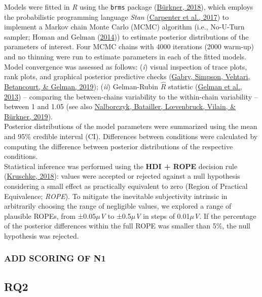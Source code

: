 \documentclass[
  man,floatsintext]{apa6}
\begin{document}
Models were fitted in \emph{R} using the \texttt{brms} package (\protect\hyperlink{ref-buxfcrkner2018}{Bürkner, 2018}), which employs the probabilistic programming language \emph{Stan} (\protect\hyperlink{ref-carpenter2017}{Carpenter et al., 2017}) to implement a Markov chain Monte Carlo (MCMC) algorithm (i.e., No-U-Turn sampler; Homan and Gelman (\protect\hyperlink{ref-homan2014}{2014})) to estimate posterior distributions of the parameters of interest. Four MCMC chains with 4000 iterations (2000 warm-up) and no thinning were run to estimate parameters in each of the fitted models. Model convergence was assessed as follows: (\emph{i}) visual inspection of trace plots, rank plots, and graphical posterior predictive checks (\protect\hyperlink{ref-gabry2019}{Gabry, Simpson, Vehtari, Betancourt, \& Gelman, 2019}); (\emph{ii}) Gelman-Rubin \(\hat{R}\) statistic (\protect\hyperlink{ref-gelman2013}{Gelman et al., 2013}) -- comparing the between-chains variability to the within-chain variability -- between 1 and 1.05 (see also \protect\hyperlink{ref-Nalborczyk2019}{Nalborczyk, Batailler, Lœvenbruck, Vilain, \& Bürkner, 2019}).\\
Posterior distributions of the model parameters were summarized using the mean and 95\% credible interval (CI). Differences between conditions were calculated by computing the difference between posterior distributions of the respective conditions.\\
Statistical inference was performed using the \textbf{HDI + ROPE} decision rule (\protect\hyperlink{ref-kruschke2018}{Kruschke, 2018}): values were accepted or rejected against a null hypothesis considering a small effect as practically equivalent to zero (Region of Practical Equivalence; \emph{ROPE}). To mitigate the inevitable subjectivity intrinsic in arbitrarily choosing the range of negligible values, we explored a range of plausible ROPEs, from ±0.05\(\mu\)\emph{V} to ±0.5\(\mu\)\emph{V} in steps of 0.01\(\mu\)\emph{V}. If the percentage of the posterior differences within the full ROPE was smaller than 5\%, the null hypothesis was rejected.

\hypertarget{add-scoring-of-n1}{%
\subsubsection{ADD SCORING OF N1}\label{add-scoring-of-n1}}

\hypertarget{rq2}{%
\subsection{RQ2}\label{rq2}}
\end{document}
